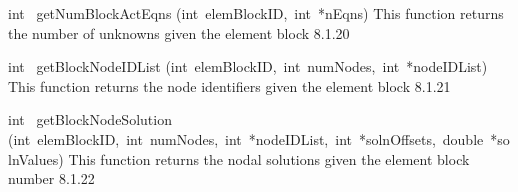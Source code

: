 \documentclass{article}
\begin{document}
\begin{cxxentry}
\begin{cxxentry}
\begin{cxxfunction}
\begin{cxxdoc}
\end{cxxdoc}
\end{cxxfunction}
\begin{cxxfunction}
{int\ }
        {getNumBlockActEqns}
        {(int\ elemBlockID,\ int\ *nEqns)}
        {
This function returns the number of unknowns given the element block}
        {8.1.20}
\begin{cxxdoc}

\end{cxxdoc}
\end{cxxfunction}
\begin{cxxfunction}
{int\ }
        {getBlockNodeIDList}
        {(int\ elemBlockID,\ int\ numNodes,\ int\ *nodeIDList)}
        {
This function returns the node identifiers given the element block}
        {8.1.21}
\begin{cxxdoc}

\end{cxxdoc}
\end{cxxfunction}
\begin{cxxfunction}
{int\ }
        {getBlockNodeSolution}
        {(int\ elemBlockID,\ int\ numNodes,\ int\ *nodeIDList,\ int\ *solnOffsets,\ double\ *solnValues)}
        {
This function returns the nodal solutions given the element block number}
        {8.1.22}
\begin{cxxdoc}


\end{cxxdoc}
\end{cxxfunction}
\end{cxxentry}
\end{cxxentry}
\end{document}
